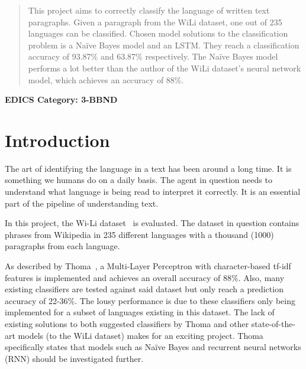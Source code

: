 \documentclass[conference]{IEEEtran}
\begin{document}




\maketitle

\begin{abstract}
  This project aims to correctly classify the language of written text paragraphs. Given a paragraph from the WiLi dataset, one out of 235 languages can be classified. Chosen model solutions to the classification problem is a Naïve Bayes model and an LSTM. They reach a classification accuracy of 93.87\% and 63.87\% respectively. The Naïve Bayes model performs a lot better than the author of the WiLi dataset's neural network model, which achieves an accuracy of 88\%.
\end{abstract}





\ifCLASSOPTIONpeerreview
\begin{center} \bfseries EDICS Category: 3-BBND \end{center}
\fi
%
\IEEEpeerreviewmaketitle



\section{Introduction}
The art of identifying the language in a text has been around a long time. It is something we humans do on a daily basis. The agent in question needs to understand what language is being read to interpret it correctly. It is an essential part of the pipeline of understanding text. 

In this project, the Wi-Li dataset~\cite{wili} is evaluated. The dataset in question contains phrases from Wikipedia in 235 different languages with a thousand (1000) paragraphs from each language.

As described by Thoma~\cite{wili}, a Multi-Layer Perceptron with character-based tf-idf features is implemented and achieves an overall accuracy of 88\%. Also, many existing classifiers are tested against said dataset but only reach a prediction accuracy of 22-36\%. The lousy performance is due to these classifiers only being implemented for a subset of languages existing in this dataset. The lack of existing solutions to both suggested classifiers by Thoma and other state-of-the-art models (to the WiLi dataset) makes for an exciting project. Thoma specifically states that models such as Naïve Bayes and recurrent neural networks (RNN) should be investigated further.
\end{document}
